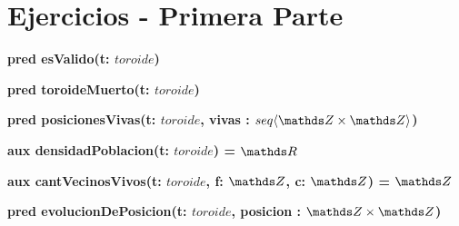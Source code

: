 \documentclass[spanish, a4paper]{article}
\newcommand{\tupla}[2]{#1 \times #2}
\begin{document}
\newcommand{\toroide}{\textit{toroide}}
\newcommand{\bin}{\ensuremath{\ent \times \ent}}

\fecha{\today}


\maketitle

\section{Ejercicios - Primera Parte}




\begin{ejercicio}[:]
\textbf{pred esValido(t: $\toroide$)}


\end{ejercicio}

\begin{ejercicio}[:]
\textbf{pred toroideMuerto(t: $\toroide$)}

\end{ejercicio}


\begin{ejercicio}[:]
\textbf{pred posicionesVivas(t: $\toroide$, vivas : $\TLista{\tupla{\ent}{\ent}}$)}

\end{ejercicio}

\begin{ejercicio}[:]
\textbf{aux densidadPoblacion(t: $\toroide$) = $\float$}

\end{ejercicio}

\begin{ejercicio}[:]
\textbf{aux cantVecinosVivos(t: $\toroide$, f: $\ent$, c: $\ent$) = $\ent$}

\end{ejercicio}


\begin{ejercicio}[:]
\textbf{pred evolucionDePosicion(t: $\toroide$, posicion : $\tupla{\ent}{\ent}$)}

\end{ejercicio}
\end{document}
